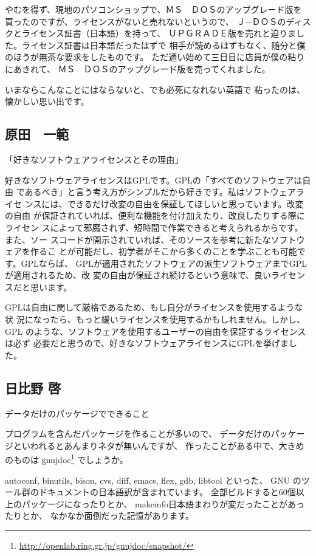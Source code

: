 \documentclass[mingoth,a4paper]{jsarticle}
\begin{document}
\begin{multicols}{2}
{やむを得ず、現地のパソコンショップで、ＭＳ　ＤＯＳのアップグレード版を
買ったのですが、ライセンスがないと売れないというので、
Ｊ−ＤＯＳのディスクとライセンス証書（日本語）を持って、
ＵＰＧＲＡＤＥ版を売れと迫りました。ライセンス証書は日本語だったはずで
相手が読めるはずもなく、随分と僕のほうが無茶な要求をしたものです。
ただ通い始めて三日目に店員が僕の粘りにあきれて、
ＭＳ　ＤＯＳのアップグレード版を売ってくれました。

いまならこんなことにはならないと、でも必死になれない英語で
粘ったのは、懐かしい思い出です。

\subsection{原田　一範}


「好きなソフトウェアライセンスとその理由」

好きなソフトウェアライセンスはGPLです。GPLの「すべてのソフトウェアは自由
であるべき」と言う考え方がシンプルだから好きです。私はソフトウェアライセ
ンスには、できるだけ改変の自由を保証してほしいと思っています。改変の自由
が保証されていれば、便利な機能を付け加えたり、改良したりする際にライセン
スによって邪魔されず、短時間で作業できると考えられるからです。また、ソー
スコードが開示されていれば、そのソースを参考に新たなソフトウェアを作るこ
とが可能だし、初学者がそこから多くのことを学ぶことも可能です。GPLならば、
GPLが適用されたソフトウェアの派生ソフトウェアまでGPLが適用されるため、改
変の自由が保証され続けるという意味で、良いライセンスだと思います。

GPLは自由に関して厳格であるため、もし自分がライセンスを使用するような状
況になったら、もっと緩いライセンスを使用するかもしれません。しかし、GPL
のような、ソフトウェアを使用するユーザーの自由を保証するライセンスは必ず
必要だと思うので、好きなソフトウェアライセンスにGPLを挙げました。

\subsection{日比野 啓}

データだけのパッケージでできること

プログラムを含んだパッケージを作ることが多いので、
データだけのパッケージといわれるとあんまりネタが無いんですが、
作ったことがある中で、大きめのものは 
gnujdoc\footnote{\url{http://openlab.ring.gr.jp/gnujdoc/snapshot/}} でしょうか。

autoconf, binutils, bison, cvs, diff, emacs, flex, gdb, libtool といった、
GNU のツール群のドキュメントの日本語訳が含まれています。
全部ビルドすると60個以上のパッケージになったりとか、
makeinfo日本語まわりが変だったことがあったりとか、
なかなか面倒だった記憶があります。

}
\end{multicols}
\end{document}
